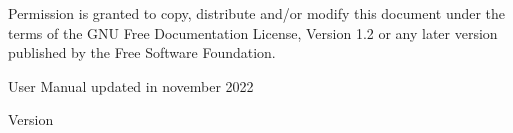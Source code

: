 {\begin{titlepage}
\begin{flushleft}
    Permission is granted to copy, distribute and/or modify this document under the terms of the GNU Free Documentation License, Version 1.2 or any later version published by the Free Software Foundation.

    User Manual updated in november 2022
    \end{flushleft}
    \end{titlepage}
    \pagestyle{headings}
}{%
    \begin{titlepage}
        \large{Version \DocVersion}
    \end{titlepage}
    \clearemptydoublepage \pagestyle{headings}
    \clearemptydoublepage {}
}
\makeatother
